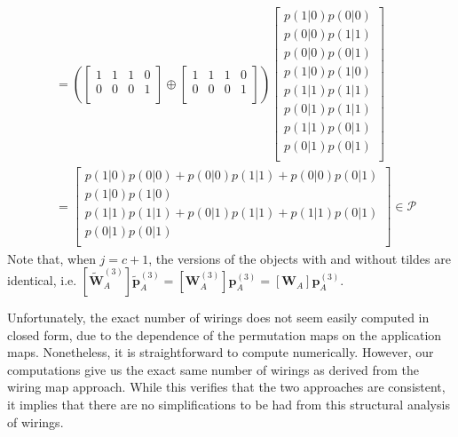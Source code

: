 \documentclass[10pt, a4paper]{article}
\numberwithin{equation}{section} %
\theoremstyle{definition}
\theoremstyle{plain}
\newcommand{\?}{\mathrel{?}} %
\newcommand{\cvec}[1]{\boldsymbol{\mathbf{#1}}}    %
\newcommand{\matrp}[2]{\left[\mathbf{#1}#2\right]} %
\newcommand{\sP}{\mathcal{P}}
\begin{document}
\begin{align}
                                             &=
          \left( \begin{bmatrix}
          1 & 1 & 1 & 0 \\
          0 & 0 & 0 & 1 \\
          \end{bmatrix} \oplus \begin{bmatrix}
          1 & 1 & 1 & 0 \\
          0 & 0 & 0 & 1 \\
          \end{bmatrix} \right)
          \begin{bmatrix} 
            p(1|0) p(0|0) \\ p(0|0) p(1|1) \\ p(0|0) p(0|1) \\ p(1|0) p(1|0) \\
            p(1|1) p(1|1) \\ p(0|1) p(1|1) \\ p(1|1) p(0|1) \\ p(0|1) p(0|1) \\ 
          \end{bmatrix} \\
                                             &=
          \begin{bmatrix}
            p(1|0) p(0|0) + p(0|0) p(1|1) + p(0|0) p(0|1) \\ p(1|0) p(1|0) \\
            p(1|1) p(1|1) + p(0|1) p(1|1) + p(1|1) p(0|1) \\ p(0|1) p(0|1) \\ 
          \end{bmatrix} \in \sP
        \end{align}
        Note that, when \(j=c+1\), the versions of the objects with and without tildes are identical, i.e. \(\matrp{\tilde{W}}{_A^{(3)}} \cvec{\tilde{p}}_A^{(3)} = \matrp{{W}}{^{(3)}_A} \cvec{{p}}_A^{(3)} = \matrp{W}{_A} \cvec{p}_A^{(3)}\).

      Unfortunately, the exact number of wirings does not seem easily computed in closed form, due to the dependence of the permutation maps on the application maps. Nonetheless, it is straightforward to compute numerically. However, our computations give us the exact same number of wirings as derived from the wiring map approach. While this verifies that the two approaches are consistent, it implies that there are no simplifications to be had from this structural analysis of wirings.
\end{document}
